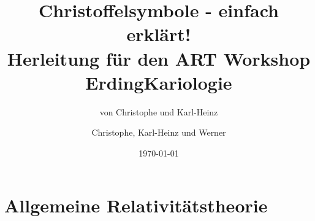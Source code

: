 \documentclass[11pt,a4paper]{article}
\title{Christoffelsymbole - einfach erklärt! \\
      Herleitung für den ART Workshop Erding}
\author{von Christophe und Karl-Heinz}
\date{\today}
\begin{document}
	\title{Kariologie}
	
	\author{Christophe, Karl-Heinz und Werner}
	
	\maketitle

\tableofcontents{}
	\cleardoublepage
	
	
	\part{Allgemeine Relativitätstheorie}
	  
	  
	  
	  
	  
	  
	  
	  
	
	\markboth{}{}
    
    
  
\end{document}

